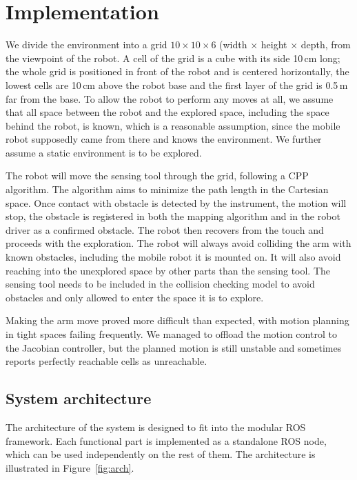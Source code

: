 \documentclass[buriama8_dp.tex]{subfiles}
\begin{document}
\chapter{Implementation}

We divide the environment into a grid \(10 \times 10 \times 6\) (width \(\times\) height \(\times\) depth, from the viewpoint of the robot. A cell of the grid is a cube with its side 10\,cm long; the whole grid is positioned in front of the robot and is centered horizontally, the lowest cells are 10\,cm above the robot base and the first layer of the grid is 0.5\,m far from the base. To allow the robot to perform any moves at all, we assume that all space between the robot and the explored space, including the space behind the robot, is known, which is a reasonable assumption, since the mobile robot supposedly came from there and knows the environment. We further assume a static environment is to be explored.

The robot will move the sensing tool through the grid, following a CPP algorithm. The algorithm aims to minimize the path length in the Cartesian space. Once contact with obstacle is detected by the instrument, the motion will stop, the obstacle is registered in both the mapping algorithm and in the robot driver as a confirmed obstacle. The robot then recovers from the touch and proceeds with the exploration. The robot will always avoid colliding the arm with known obstacles, including the mobile robot it is mounted on. It will also avoid reaching into the unexplored space by other parts than the sensing tool. The sensing tool needs to be included in the collision checking model to avoid obstacles and only allowed to enter the space it is to explore.

Making the arm move proved more difficult than expected, with motion planning in tight spaces failing frequently. We managed to offload the motion control to the Jacobian controller, but the planned motion is still unstable and sometimes reports perfectly reachable cells as unreachable.

\section{System architecture}
\label{sec:impl_arch}

The architecture of the system is designed to fit into the modular ROS framework. Each functional part is implemented as a standalone ROS node, which can be used independently on the rest of them. The architecture is illustrated in Figure~\ref{fig:arch}.
\end{document}
